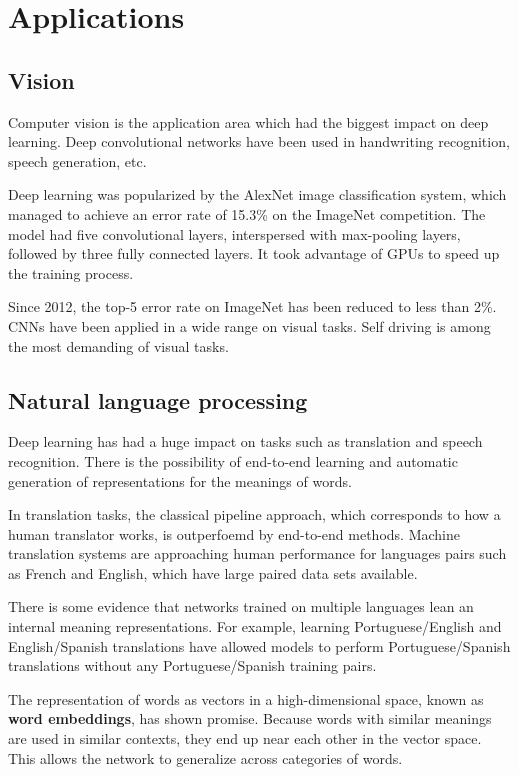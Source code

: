 \documentclass{article}
\begin{document}
\section{Applications}

\subsection{Vision}

Computer vision is the application area which had the biggest impact on deep learning.
Deep convolutional networks have been used in handwriting recognition, speech 
generation, etc.

Deep learning was popularized by the AlexNet image classification system, which
managed to achieve an error rate of 15.3\% on the ImageNet competition. The model 
had five convolutional layers, interspersed with max-pooling layers, followed by three 
fully connected layers. It took advantage of GPUs to speed up the training process.

Since 2012, the top-5 error rate on ImageNet has been reduced to less than 2\%.
CNNs have been applied in a wide range on visual tasks. Self driving is among the
most demanding of visual tasks.

\subsection{Natural language processing}

Deep learning has had a huge impact on tasks such as translation and speech recognition.
There is the possibility of end-to-end learning and automatic generation of representations
for the meanings of words.

In translation tasks, the classical pipeline approach, which corresponds to how a 
human translator works, is outperfoemd by end-to-end methods. Machine translation
systems are approaching human performance for languages pairs such as French
and English, which have large paired data sets available.

There is some evidence that networks trained on multiple languages lean an internal
meaning representations. For example, learning Portuguese/English and English/Spanish
translations have allowed models to perform Portuguese/Spanish translations without
any Portuguese/Spanish training pairs.

The representation of words as vectors in a high-dimensional space, known as
\textbf{word embeddings}, has shown promise. Because words with similar meanings
are used in similar contexts, they end up near each other in the vector space. 
This allows the network to generalize across categories of words.
\end{document}
